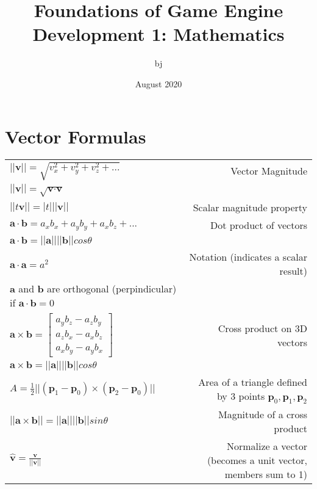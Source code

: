 \documentclass{article}
\title{Foundations of Game Engine Development 1: Mathematics}
\author{bj}
\date{August 2020}
\begin{document}
\maketitle

\section{Vector Formulas}

{\setlength{\extrarowheight}{10pt}
\begin{tabulary}{8in}{LR}
$ ||\textbf{v}|| = \sqrt{ v_x^2  + v_y^2 + v_z^2 + ...} $ & Vector Magnitude \\
$ ||\textbf{v}|| = \sqrt{ \textbf{v} \cdot \textbf{v} } $ & \\

$ ||t\textbf{v}|| = |t| ||\textbf{v}|| $ & Scalar magnitude property \\

$ \textbf{a} \cdot \textbf{b} = a_x b_x + a_y b_y + a_x b_z + ... $ & Dot product of vectors \\ 
$ \textbf{a} \cdot \textbf{b} = ||\textbf{a}|| ||\textbf{b}|| cos\theta $ & \\
$ \textbf{a} \cdot \textbf{a} = a^2$ & Notation (indicates a scalar result) \\

\textbf{a} and \textbf{b} are orthogonal (perpindicular) if $\textbf{a} \cdot \textbf{b} = 0$ & \\

$
\textbf{a} \times \textbf{b} = \begin{bmatrix}
	a_y b_z - a_z b_y \\ 
	a_z b_x - a_x b_z \\ 
	a_x b_y - a_y b_x
	\end{bmatrix}
$ & Cross product on 3D vectors \\

$ \textbf{a} \times \textbf{b} = ||\textbf{a}|| ||\textbf{b}|| cos \theta$ &
 \\

$A = \frac{1}{2} ||(\textbf{p}_1 - \textbf{p}_0) \times (\textbf{p}_2 - \textbf{p}_0)|| $ & 
Area of a triangle defined by 3 points $\textbf{p}_0, \textbf{p}_1, \textbf{p}_2$ \\


$||\textbf{a} \times \textbf{b}|| = ||\textbf{a}|| ||\textbf{b}|| sin\theta$ & 
Magnitude of a cross product \\


$ \hat{\textbf{v}} = \frac{\textbf{v}}{||\textbf{v}||} $ & 
Normalize a vector (becomes a unit vector, members sum to 1) \\


\end{tabulary}}
\end{document}
